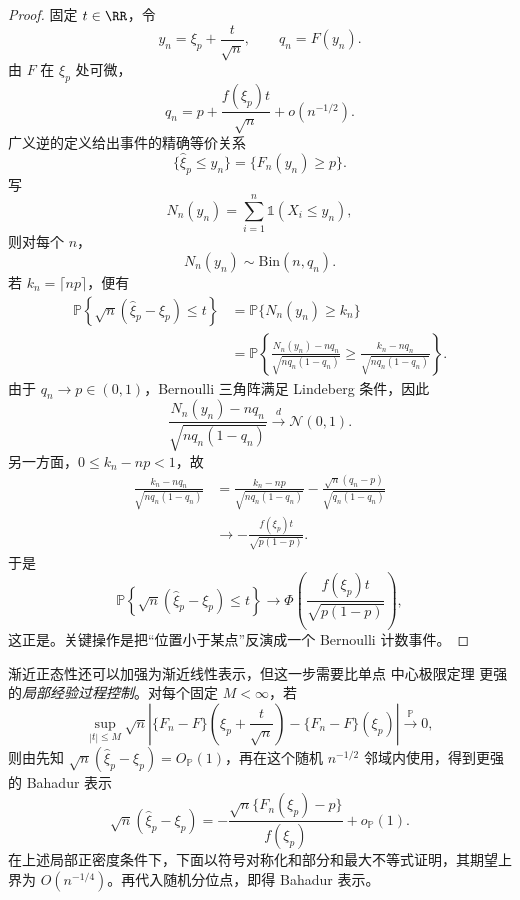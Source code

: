 \begin{proof}
固定 $t\in\RR$，令
\[
 y_n=\xi_p+\frac{t}{\sqrt n},
 \qquad
 q_n=F(y_n).
\]
由 $F$ 在 $\xi_p$ 处可微，
\[
 q_n
 =p+\frac{f(\xi_p)t}{\sqrt n}
 +o(n^{-1/2}).
\]
广义逆的定义给出事件的精确等价关系
\[
 \{\widehat\xi_p\le y_n\}
 =\{F_n(y_n)\ge p\}.
\]
写
\[
 N_n(y_n)=\sum_{i=1}^n\mathds{1}(X_i\le y_n),
\]
则对每个 $n$，
\[
 N_n(y_n)\sim\mathrm{Bin}(n,q_n).
\]
若 $k_n=\lceil np\rceil$，便有
\begin{align*}
 \mathbb P\!\left\{
 \sqrt n(\widehat\xi_p-\xi_p)\le t
 \right\}
 &=\mathbb P\{N_n(y_n)\ge k_n\}\\
 &=\mathbb P\!\left\{
 \frac{N_n(y_n)-nq_n}{\sqrt{nq_n(1-q_n)}}
 \ge
 \frac{k_n-nq_n}{\sqrt{nq_n(1-q_n)}}
 \right\}.
\end{align*}
由于 $q_n\to p\in(0,1)$，Bernoulli 三角阵满足 Lindeberg 条件，因此
\[
 \frac{N_n(y_n)-nq_n}{\sqrt{nq_n(1-q_n)}}
 \xrightarrow{d}\mathcal N(0,1).
\]
另一方面，$0\le k_n-np<1$，故
\begin{align*}
 \frac{k_n-nq_n}{\sqrt{nq_n(1-q_n)}}
 &=\frac{k_n-np}{\sqrt{nq_n(1-q_n)}}
 -\frac{\sqrt n(q_n-p)}{\sqrt{q_n(1-q_n)}}\\
 &\longrightarrow
 -\frac{f(\xi_p)t}{\sqrt{p(1-p)}}.
\end{align*}
于是
\[
 \mathbb P\!\left\{
 \sqrt n(\widehat\xi_p-\xi_p)\le t
 \right\}
 \longrightarrow
 \Phi\!\left(
 \frac{f(\xi_p)t}{\sqrt{p(1-p)}}
 \right),
\]
这正是。关键操作是把“位置小于某点”反演成一个 Bernoulli 计数事件。

\end{proof}

\begin{proposition}
渐近正态性还可以加强为渐近线性表示，但这一步需要比单点 中心极限定理 更强的\emph{局部经验过程控制}。对每个固定 $M<\infty$，若
\begin{equation}\label{eq:math-stat-local-empirical-equicontinuity}
 \sup_{|t|\le M}
 \sqrt n\left|
 \{F_n-F\}\!\left(\xi_p+\frac{t}{\sqrt n}\right)
 -\{F_n-F\}(\xi_p)
 \right|
 \xrightarrow{\mathbb P}0,
\end{equation}
则由先知
$\sqrt n(\widehat\xi_p-\xi_p)=O_{\mathbb P}(1)$，再在这个随机 $n^{-1/2}$ 邻域内使用，得到更强的 Bahadur 表示
\begin{equation}\label{eq:math-stat-quantile-bahadur}
 \sqrt n(\widehat\xi_p-\xi_p)
 =-\frac{\sqrt n\{F_n(\xi_p)-p\}}{f(\xi_p)}
 +o_{\mathbb P}(1).
\end{equation}
在上述局部正密度条件下，下面以符号对称化和部分和最大不等式证明，其期望上界为 $O(n^{-1/4})$。再代入随机分位点，即得 Bahadur 表示。

\end{proposition}

